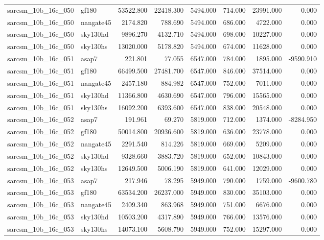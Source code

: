 \begin{tabular}{llrrrrrr}
sarcsm\_10b\_16c\_050 & gf180 & 53522.800 & 22418.300 & 5494.000 & 714.000 & 23991.000 & 0.000 \\
sarcsm\_10b\_16c\_050 & nangate45 & 2174.820 & 788.690 & 5494.000 & 686.000 & 4722.000 & 0.000 \\
sarcsm\_10b\_16c\_050 & sky130hd & 9896.270 & 4132.710 & 5494.000 & 698.000 & 10227.000 & 0.000 \\
sarcsm\_10b\_16c\_050 & sky130hs & 13020.000 & 5178.820 & 5494.000 & 674.000 & 11628.000 & 0.000 \\
sarcsm\_10b\_16c\_051 & asap7 & 221.801 & 77.055 & 6547.000 & 784.000 & 1895.000 & -9590.910 \\
sarcsm\_10b\_16c\_051 & gf180 & 66499.500 & 27481.700 & 6547.000 & 846.000 & 37514.000 & 0.000 \\
sarcsm\_10b\_16c\_051 & nangate45 & 2457.180 & 884.982 & 6547.000 & 752.000 & 7011.000 & 0.000 \\
sarcsm\_10b\_16c\_051 & sky130hd & 11366.800 & 4630.690 & 6547.000 & 796.000 & 15565.000 & 0.000 \\
sarcsm\_10b\_16c\_051 & sky130hs & 16092.200 & 6393.600 & 6547.000 & 838.000 & 20548.000 & 0.000 \\
sarcsm\_10b\_16c\_052 & asap7 & 191.961 & 69.270 & 5819.000 & 712.000 & 1374.000 & -8284.950 \\
sarcsm\_10b\_16c\_052 & gf180 & 50014.800 & 20936.600 & 5819.000 & 636.000 & 23778.000 & 0.000 \\
sarcsm\_10b\_16c\_052 & nangate45 & 2291.540 & 814.226 & 5819.000 & 669.000 & 5209.000 & 0.000 \\
sarcsm\_10b\_16c\_052 & sky130hd & 9328.660 & 3883.720 & 5819.000 & 652.000 & 10843.000 & 0.000 \\
sarcsm\_10b\_16c\_052 & sky130hs & 12649.500 & 5006.190 & 5819.000 & 641.000 & 12029.000 & 0.000 \\
sarcsm\_10b\_16c\_053 & asap7 & 217.946 & 78.295 & 5949.000 & 790.000 & 1759.000 & -9600.780 \\
sarcsm\_10b\_16c\_053 & gf180 & 63534.200 & 26237.000 & 5949.000 & 830.000 & 35103.000 & 0.000 \\
sarcsm\_10b\_16c\_053 & nangate45 & 2409.340 & 863.968 & 5949.000 & 751.000 & 6676.000 & 0.000 \\
sarcsm\_10b\_16c\_053 & sky130hd & 10503.200 & 4317.890 & 5949.000 & 766.000 & 13576.000 & 0.000 \\
sarcsm\_10b\_16c\_053 & sky130hs & 14073.100 & 5608.790 & 5949.000 & 752.000 & 15297.000 & 0.000 \\

\end{tabular}
